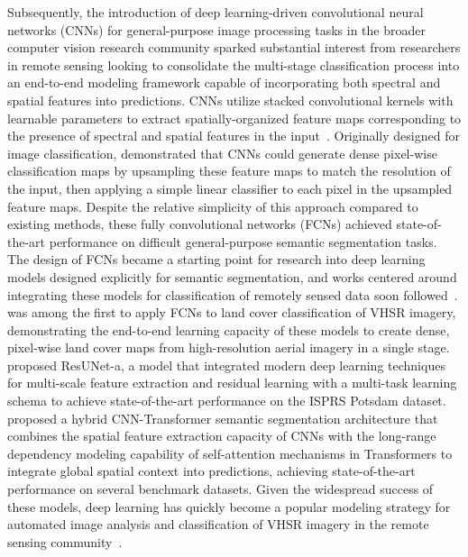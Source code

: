 Subsequently, the introduction of deep learning-driven convolutional neural networks (CNNs) for general-purpose image processing tasks in the broader computer vision research community sparked substantial interest from researchers in remote sensing looking to consolidate the multi-stage classification process into an end-to-end modeling framework capable of incorporating both spectral and spatial features into predictions.
CNNs utilize stacked convolutional kernels with learnable parameters to extract spatially-organized feature maps corresponding to the presence of spectral and spatial features in the input~\citep{krizhevskyImageNetClassificationDeep2012}.
Originally designed for image classification, \citet{longFullyConvolutionalNetworks2015} demonstrated that CNNs could generate dense pixel-wise classification maps by upsampling these feature maps to match the resolution of the input, then applying a simple linear classifier to each pixel in the upsampled feature maps.
Despite the relative simplicity of this approach compared to existing methods, these fully convolutional networks (FCNs) achieved state-of-the-art performance on difficult general-purpose semantic segmentation tasks.
The design of FCNs became a starting point for research into deep learning models designed explicitly for semantic segmentation, and works centered around integrating these models for classification of remotely sensed data soon followed~\citep{yuanReviewDeepLearning2021}.
\citet{sherrahFullyConvolutionalNetworks2016} was among the first to apply FCNs to land cover classification of VHSR imagery, demonstrating the end-to-end learning capacity of these models to create dense, pixel-wise land cover maps from high-resolution aerial imagery in a single stage.
\citet{diakogiannisResUNetdeepLearning2020} proposed ResUNet-a, a model that integrated modern deep learning techniques for multi-scale feature extraction and residual learning with a multi-task learning schema to achieve state-of-the-art performance on the ISPRS Potsdam dataset.
\citet{wangUNetFormerUNetlikeTransformer2022} proposed a hybrid CNN-Transformer semantic segmentation architecture that combines the spatial feature extraction capacity of CNNs with the long-range dependency modeling capability of self-attention mechanisms in Transformers to integrate global spatial context into predictions, achieving state-of-the-art performance on several benchmark datasets.
Given the widespread success of these models, deep learning has quickly become a popular modeling strategy for automated image analysis and classification of VHSR imagery in the remote sensing community~\citep{liDeepLearningUrban2024, zhaoLandUseLand2023}.


